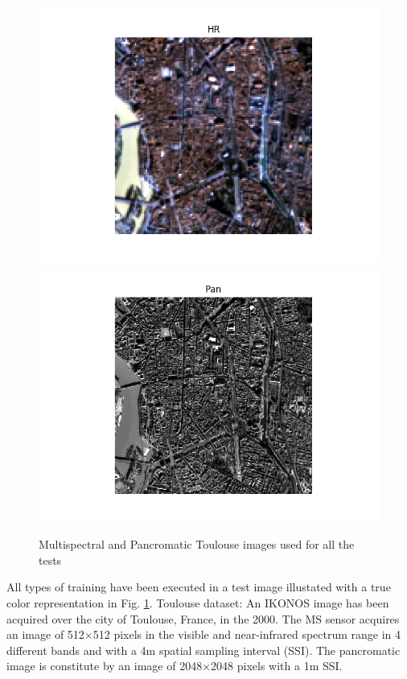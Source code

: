 \documentclass[12pt]{report}
\begin{document}
\begin{figure}[t]
    \centering
    \includegraphics[scale=.5]{toulouse.png}
    \includegraphics[scale=.5]{toulouse_pan.png}
    \caption{Multispectral and Pancromatic Toulouse images used for all the tests}
    \label{fig:toulouse}
\end{figure}


All types of training have been executed in a test image illustated with a true color representation in Fig. \ref{fig:toulouse}.
Toulouse dataset: An IKONOS image has been acquired over the city of Toulouse, France, in the 2000.
The MS sensor acquires an image of 512×512 pixels in the visible and near-infrared spectrum range in 4
different bands and with a 4m spatial sampling interval (SSI). 
The pancromatic image is constitute by an image of 2048×2048 pixels with a 1m SSI.
\end{document}
